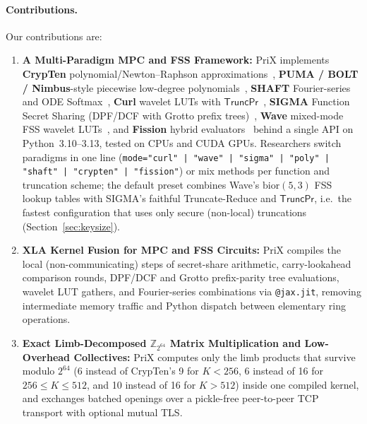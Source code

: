 \documentclass[11pt]{article}
\newcommand{\Zring}{\mathbb{Z}_{2^{64}}}
\begin{document}
\paragraph{Contributions.} Our contributions are:
\begin{enumerate}
    \item \textbf{A Multi-Paradigm MPC and FSS Framework:} PriX implements \textbf{CrypTen} polynomial/Newton--Raphson approximations~\cite{knott2021crypten}, \textbf{PUMA / BOLT / Nimbus}-style piecewise low-degree polynomials~\cite{dong2023puma,pang2024bolt,li2024nimbus}, \textbf{SHAFT} Fourier-series and ODE Softmax~\cite{kei2025shaft}, \textbf{Curl} wavelet LUTs with $\mathsf{TruncPr}$~\cite{santos2024curl,escudero2020improved}, \textbf{SIGMA} Function Secret Sharing (DPF/DCF with Grotto prefix trees)~\cite{gupta2024sigma,storrier2023grotto}, \textbf{Wave} mixed-mode FSS wavelet LUTs~\cite{reis2025wave}, and \textbf{Fission} hybrid evaluators~\cite{ugurbil2025fission} behind a single API on Python~3.10--3.13, tested on CPUs and CUDA GPUs. Researchers switch paradigms in one line (\texttt{mode="curl" | "wave" | "sigma" | "poly" | "shaft" | "crypten" | "fission"}) or mix methods per function and truncation scheme; the default preset combines Wave's $\text{bior}(5,3)$ FSS lookup tables with SIGMA's faithful Truncate-Reduce and $\mathsf{TruncPr}$, i.e.\ the fastest configuration that uses only secure (non-local) truncations (Section~\ref{sec:keysize}).
    \item \textbf{XLA Kernel Fusion for MPC and FSS Circuits:} PriX compiles the local (non-communicating) steps of secret-share arithmetic, carry-lookahead comparison rounds, DPF/DCF and Grotto prefix-parity tree evaluations, wavelet LUT gathers, and Fourier-series combinations via \texttt{@jax.jit}, removing intermediate memory traffic and Python dispatch between elementary ring operations.
    \item \textbf{Exact Limb-Decomposed $\Zring$ Matrix Multiplication and Low-Overhead Collectives:} PriX computes only the limb products that survive modulo $2^{64}$ (6 instead of CrypTen's 9 for $K < 256$, 6 instead of 16 for $256 \le K \le 512$, and 10 instead of 16 for $K > 512$) inside one compiled kernel, and exchanges batched openings over a pickle-free peer-to-peer TCP transport with optional mutual TLS.

\end{enumerate}
\end{document}
